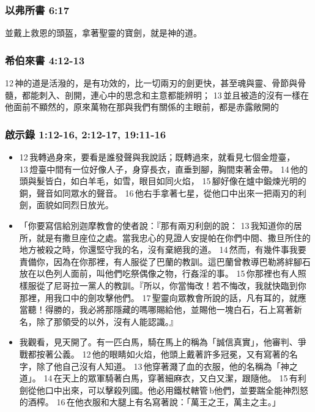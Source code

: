\subsubsection{以弗所書 6:17}
並戴上救恩的頭盔，拿著聖靈的寶劍，就是神的道。

\subsubsection{希伯來書 4:12-13}
12 神的道是活潑的，是有功效的，比一切兩刃的劍更快，甚至魂與靈、骨節與骨髓，都能刺入、剖開，連心中的思念和主意都能辨明； 13 並且被造的沒有一樣在他面前不顯然的，原來萬物在那與我們有關係的主眼前，都是赤露敞開的

\subsubsection{啟示錄 1:12-16, 2:12-17, 19:11-16}
\begin{itemize} 
\itemsep-.25em
\item 12 我轉過身來，要看是誰發聲與我說話；既轉過來，就看見七個金燈臺， 13 燈臺中間有一位好像人子，身穿長衣，直垂到腳，胸間束著金帶。 14 他的頭與髮皆白，如白羊毛，如雪，眼目如同火焰， 15 腳好像在爐中鍛煉光明的銅，聲音如同眾水的聲音。 16 他右手拿著七星，從他口中出來一把兩刃的利劍，面貌如同烈日放光。
\item 「你要寫信給別迦摩教會的使者說：『那有兩刃利劍的說： 13 我知道你的居所，就是有撒旦座位之處。當我忠心的見證人安提帕在你們中間、撒旦所住的地方被殺之時，你還堅守我的名，沒有棄絕我的道。 14 然而，有幾件事我要責備你，因為在你那裡，有人服從了巴蘭的教訓。這巴蘭曾教導巴勒將絆腳石放在以色列人面前，叫他們吃祭偶像之物，行姦淫的事。 15 你那裡也有人照樣服從了尼哥拉一黨人的教訓。『所以，你當悔改！若不悔改，我就快臨到你那裡，用我口中的劍攻擊他們。 17 聖靈向眾教會所說的話，凡有耳的，就應當聽！得勝的，我必將那隱藏的嗎哪賜給他，並賜他一塊白石，石上寫著新名，除了那領受的以外，沒有人能認識。』
\item 我觀看，見天開了。有一匹白馬，騎在馬上的稱為「誠信真實」，他審判、爭戰都按著公義。 12 他的眼睛如火焰，他頭上戴著許多冠冕，又有寫著的名字，除了他自己沒有人知道。 13 他穿著濺了血的衣服，他的名稱為「神之道」。 14 在天上的眾軍騎著白馬，穿著細麻衣，又白又潔，跟隨他。 15 有利劍從他口中出來，可以擊殺列國。他必用鐵杖轄管 b他們，並要踹全能神烈怒的酒榨。 16 在他衣服和大腿上有名寫著說：「萬王之王，萬主之主。」
\end{itemize} 













